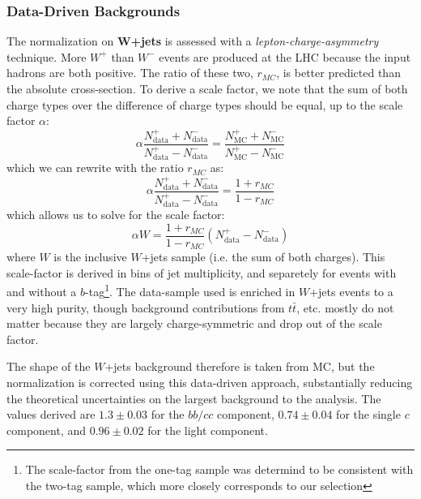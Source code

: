 	\subsubsection{Data-Driven Backgrounds}

The normalization on \textbf{$\mathbf{W}$+jets} is assessed with a \textit{lepton-charge-asymmetry} technique. More $W^+$ than $W^-$ events are produced at the LHC because the input hadrons are both positive. The ratio of these two, $r_{MC}$, is better predicted than the absolute cross-section. To derive a scale factor, we note that the sum of both charge types over the difference of charge types should be equal, up to the scale factor $\alpha$:
%
\begin{equation}
\alpha \frac{N_\mathrm{data}^+ + N_\mathrm{data}^-}{N_\mathrm{data}^+ - N_\mathrm{data}^-} = \frac{N_\mathrm{MC}^+ + N_\mathrm{MC}^-}{N_\mathrm{MC}^+ - N_\mathrm{MC}^-}
\end{equation}
% 
which we can rewrite with the ratio $r_{MC}$ as:
%
\begin{equation}
\alpha \frac{N_\mathrm{data}^+ + N_\mathrm{data}^-}{N_\mathrm{data}^+ - N_\mathrm{data}^-} = \frac{1 + r_{MC}}{1 - r_{MC}}
\end{equation}
%
which allows us to solve for the scale factor:
%
\begin{equation}
\alpha W = \frac{1 + r_{MC}}{1 - r_{MC}} \left( N_\mathrm{data}^+ - N_\mathrm{data}^- \right)
\end{equation}
%
where $W$ is the inclusive $W$+jets sample (i.e. the sum of both charges). This scale-factor is derived in bins of jet multiplicity, and separetely for events with and without a $b$-tag\footnote{The scale-factor from the one-tag sample was determind to be consistent with the two-tag sample, which more closely corresponds to our selection}. The data-sample used is enriched in $W$+jets events to a very high purity, though background contributions from $t\bar{t}$, etc. mostly do not matter because they are largely charge-symmetric and drop out of the scale factor.

The shape of the $W$+jets background therefore is taken from MC, but the normalization is corrected using this data-driven approach, substantially reducing the theoretical uncertainties on the largest background to the analysis. The values derived are $1.3 \pm 0.03$ for the $bb/cc$ component, $0.74 \pm 0.04$ for the single $c$ component, and $0.96 \pm 0.02$ for the light component.

